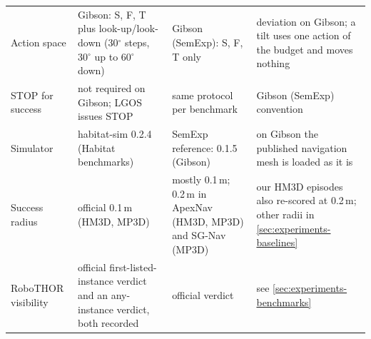 \documentclass[10pt]{article}
\newcommand{\ours}{LGOS\xspace}
\begin{document}
\begin{table}[tp]
\begin{tabular}{@{}p{2.55cm}p{3.6cm}p{3.35cm}p{4.6cm}@{}}
    Action space & Gibson: S, F, T plus look-up/look-down (30$^\circ$ steps, 30$^\circ$ up to 60$^\circ$ down) &
      Gibson (SemExp): S, F, T only & deviation on Gibson; a tilt uses one action of the budget and moves nothing \\
    STOP for success & not required on Gibson; \ours issues STOP & same protocol per benchmark & Gibson (SemExp)
      convention \\
    Simulator & habitat-sim 0.2.4 (Habitat benchmarks) & SemExp reference: 0.1.5 (Gibson) & on Gibson the published
      navigation mesh is loaded as it is \\
    Success radius & official 0.1\,m (HM3D, MP3D) & mostly 0.1\,m; 0.2\,m in ApexNav (HM3D, MP3D) and SG-Nav (MP3D)
      & our HM3D episodes also re-scored at 0.2\,m; other radii in \cref{sec:experiments-baselines} \\
    RoboTHOR visibility & official first-listed-instance verdict and an any-instance verdict, both recorded &
      official verdict & see \cref{sec:experiments-benchmarks} \\
    \bottomrule
  \end{tabular}
\end{table}
\end{document}

